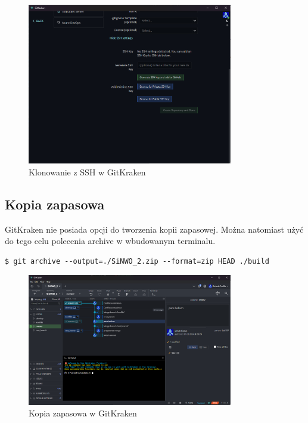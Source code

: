 \documentclass[a4paper,12pt]{article}
\begin{document}
\begin{figure}[ht]
    \centering
    \includegraphics[width=0.8\textwidth]{images/ssh.png}
    \caption{Klonowanie z SSH w GitKraken}
\end{figure}

\newpage
\clearpage

\subsection{Kopia zapasowa}
GitKraken nie posiada opcji do tworzenia kopii zapasowej. Można natomiast użyć do tego celu polecenia archive w wbudowanym terminalu.
\begin{lstlisting}[caption={Kopia zapasowa w terminalu},captionpos=b]
    $ git archive --output=./SiNWO_2.zip --format=zip HEAD ./build
\end{lstlisting}
\begin{figure}[ht]
    \centering
    \includegraphics[width=0.8\textwidth]{images/backup.png}
    \caption{Kopia zapasowa w GitKraken}
\end{figure}
\end{document}
